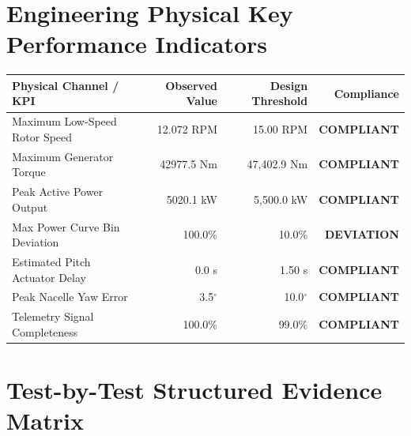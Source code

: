 \documentclass[10pt,a4paper]{article}
\begin{document}
\vspace{0.6cm}

\section{Engineering Physical Key Performance Indicators}

\begin{table}[h!]
\centering
\begin{tabularx}{\textwidth}{Xrrr}
    \toprule
    \textbf{Physical Channel / KPI} & \textbf{Observed Value} & \textbf{Design Threshold} & \textbf{Compliance} \\
    \midrule
    Maximum Low-Speed Rotor Speed & 12.072 RPM & 15.00 RPM & \textcolor{PassGreen}{\textbf{COMPLIANT}} \\
    Maximum Generator Torque & 42977.5 Nm & 47,402.9 Nm & \textcolor{PassGreen}{\textbf{COMPLIANT}} \\
    Peak Active Power Output & 5020.1 kW & 5,500.0 kW & \textcolor{PassGreen}{\textbf{COMPLIANT}} \\
    Max Power Curve Bin Deviation & 100.0\% & 10.0\% & \textcolor{WarnAmber}{\textbf{DEVIATION}} \\
    Estimated Pitch Actuator Delay & 0.0 s & 1.50 s & \textcolor{PassGreen}{\textbf{COMPLIANT}} \\
    Peak Nacelle Yaw Error & 3.5$^\circ$ & 10.0$^\circ$ & \textcolor{PassGreen}{\textbf{COMPLIANT}} \\
    Telemetry Signal Completeness & 100.0\% & 99.0\% & \textcolor{PassGreen}{\textbf{COMPLIANT}} \\
    \bottomrule
\end{tabularx}
\end{table}

\vspace{0.4cm}

\section{Test-by-Test Structured Evidence Matrix}
\end{document}
